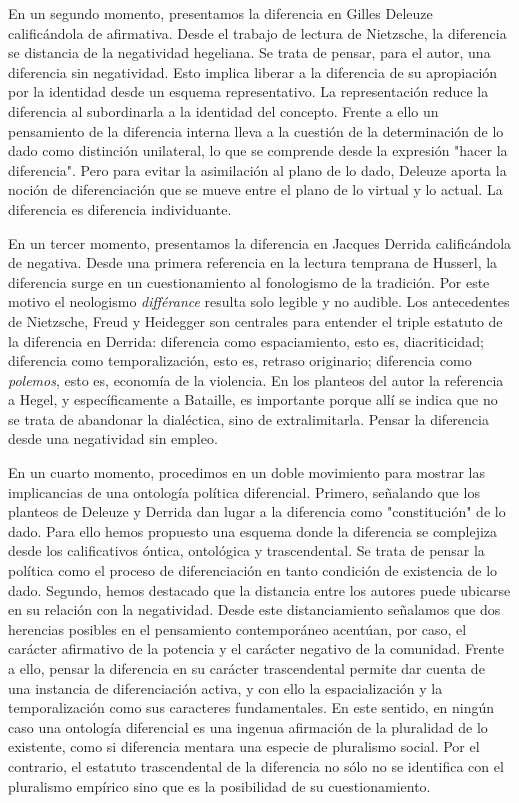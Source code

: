 \documentclass{book}
\begin{document}
En un segundo momento, presentamos la diferencia en Gilles Deleuze
calificándola de afirmativa. Desde el trabajo de lectura de Nietzsche,
la diferencia se distancia de la negatividad hegeliana. Se trata de
pensar, para el autor, una diferencia sin negatividad. Esto implica
liberar a la diferencia de su apropiación por la identidad desde un
esquema representativo. La representación reduce la diferencia al
subordinarla a la identidad del concepto. Frente a ello un pensamiento
de la diferencia interna lleva a la cuestión de la determinación de lo
dado como distinción unilateral, lo que se comprende desde la expresión
"hacer la diferencia". Pero para evitar la asimilación al plano de lo
dado, Deleuze aporta la noción de diferenciación que se mueve entre el
plano de lo virtual y lo actual. La diferencia es diferencia
individuante.

En un tercer momento, presentamos la diferencia en Jacques Derrida
calificándola de negativa. Desde una primera referencia en la lectura
temprana de Husserl, la diferencia surge en un cuestionamiento al
fonologismo de la tradición. Por este motivo el neologismo
\emph{différance} resulta solo legible y no audible. Los antecedentes de
Nietzsche, Freud y Heidegger son centrales para entender el triple
estatuto de la diferencia en Derrida: diferencia como espaciamiento,
esto es, diacriticidad; diferencia como temporalización, esto es,
retraso originario; diferencia como \emph{polemos}, esto es, economía de
la violencia. En los planteos del autor la referencia a Hegel, y
específicamente a Bataille, es importante porque allí se indica que no
se trata de abandonar la dialéctica, sino de extralimitarla. Pensar la
diferencia desde una negatividad sin empleo.

En un cuarto momento, procedimos en un doble movimiento para mostrar las
implicancias de una ontología política diferencial. Primero, señalando
que los planteos de Deleuze y Derrida dan lugar a la diferencia como
"constitución" de lo dado. Para ello hemos propuesto una esquema donde
la diferencia se complejiza desde los calificativos óntica, ontológica y
trascendental. Se trata de pensar la política como el proceso de
diferenciación en tanto condición de existencia de lo dado. Segundo,
hemos destacado que la distancia entre los autores puede ubicarse en su
relación con la negatividad. Desde este distanciamiento señalamos que
dos herencias posibles en el pensamiento contemporáneo acentúan, por
caso, el carácter afirmativo de la potencia y el carácter negativo de la
comunidad. Frente a ello, pensar la diferencia en su carácter
trascendental permite dar cuenta de una instancia de diferenciación
activa, y con ello la espacialización y la temporalización como sus
caracteres fundamentales. En este sentido, en ningún caso una ontología
diferencial es una ingenua afirmación de la pluralidad de lo existente,
como si diferencia mentara una especie de pluralismo social. Por el
contrario, el estatuto trascendental de la diferencia no sólo no se
identifica con el pluralismo empírico sino que es la posibilidad de su
cuestionamiento.
\end{document}
